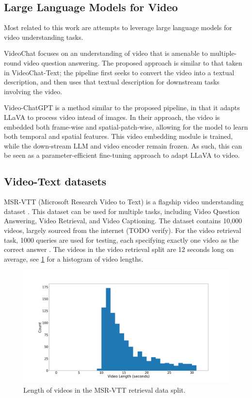 \documentclass{article}
\begin{document}
\subsection{Large Language Models for Video}

Most related to this work are attempts to leverage large language models for video understanding tasks.

VideoChat \cite{videochat} focuses on an understanding of video that is amenable to multiple-round video question answering.
The proposed approach is similar to that taken in VideoChat-Text; the pipeline first seeks to convert the video into a textual description, and then uses that textual description for downstream tasks involving the video.

Video-ChatGPT \cite{videochatgpt} is a method similar to the proposed pipeline, in that it adapts LLaVA to process video intead of images.
In their approach, the video is embedded both frame-wise and spatial-patch-wise, allowing for the model to learn both temporal and spatial features.
This video embedding module is trained, while the down-stream LLM and video encoder remain frozen. As such, this can be seen as a parameter-efficient fine-tuning approach to adapt LLaVA to video.




\subsection{Video-Text datasets}
MSR-VTT (Microsoft Research Video to Text) is a flagship video understanding dataset \cite{msr-vtt}.
This dataset can be used for multiple tasks, including Video Question Answering, Video Retrieval, and Video Captioning.
The dataset contains 10,000 videos, largely sourced from the internet (TODO verify).
For the video retrieval task, 1000 queries are used for testing, each specifying exactly one video as the correct answer \cite{jsfusion}.
The videos in the video retrieval split are 12 seconds long on average, see \ref{fig:length_histogram} for a histogram of video lengths.

\begin{figure}
      \centering
      \includegraphics[width=\textwidth]{figures/msr-vtt-length-histogram.png}
      \caption{Length of videos in the MSR-VTT retrieval data split.}
      \label{fig:length_histogram}
\end{figure}
\end{document}

